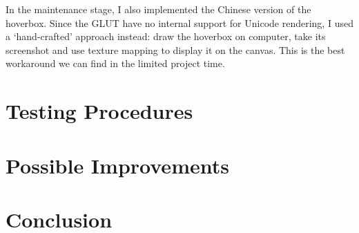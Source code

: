 \documentclass[10pt,a4paper]{article}
\begin{document}
In the maintenance stage, I also implemented the Chinese version of
the hoverbox. Since the GLUT have no internal support for Unicode
rendering, I used a `hand-crafted' approach instead: draw the hoverbox
on computer, take its screenshot and use texture mapping to display it
on the canvas. This is the best workaround we can find in the limited
project time.

\section{Testing Procedures}
\label{sec:orgd2879f4}

\section{Possible Improvements}
\label{sec:org8314ce4}

\section{Conclusion}
\label{sec:org035f984}
\end{document}
